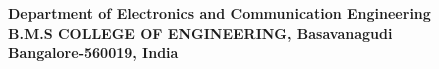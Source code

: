 \begin{center}
\vspace*{3mm}

\fontsize{14pt}{16.8pt}\selectfont\textbf{Department of Electronics and Communication Engineering \\
\vspace*{2mm} B.M.S COLLEGE OF ENGINEERING, Basavanagudi} \\
\vspace*{2mm}
\fontsize{14pt}{16.8pt}\selectfont\textbf{Bangalore-560019, India} 
\vspace*{10mm}\\

\end{center}
